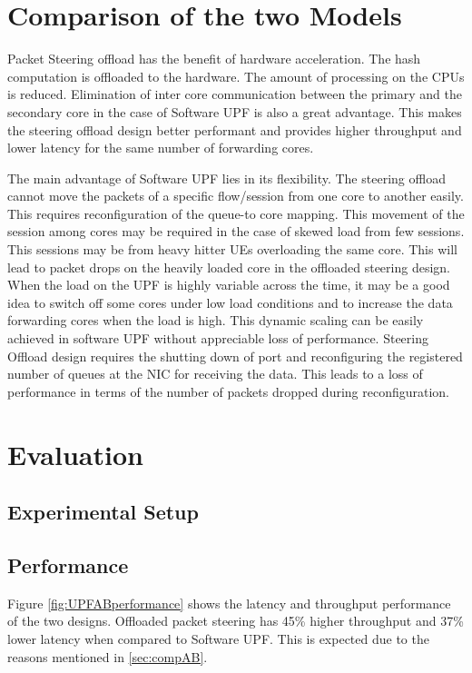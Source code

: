 \section{Comparison of the two Models \label{sec:compAB}}
Packet Steering offload has the benefit of hardware acceleration. The hash computation is offloaded to the hardware. The amount of processing on the CPUs is reduced. Elimination of inter core communication between the primary and the secondary core in the case of Software UPF is also a great advantage. This makes the steering offload design better performant and provides higher throughput and lower latency for the same number of forwarding cores.

The main advantage of Software UPF lies in its flexibility. The steering offload cannot move the packets of a specific flow/session from one core to another easily. This requires reconfiguration of the queue-to core mapping.
This movement of the session among cores may be required in the case of skewed load from few sessions. This sessions may be from heavy hitter UEs overloading the same core. This will lead to packet drops on the heavily loaded core in the offloaded steering design.
When the load on the UPF is highly variable across the time, it may be a good idea to switch off some cores under low load conditions and to increase the data
forwarding cores when the load is high. This dynamic scaling can be easily
achieved in software UPF without appreciable loss of performance. Steering Offload design requires the shutting down of port and reconfiguring the registered number of queues at the NIC for receiving the data. This leads to a loss of performance in terms of the number of packets dropped during reconfiguration.

\section{Evaluation}
\subsection{Experimental Setup}
\subsection{Performance}
Figure \ref{fig:UPFABperformance} shows the latency and throughput performance of the two designs.
Offloaded packet steering has 45\% higher throughput and 37\% lower latency when compared to Software UPF. This is expected due to the reasons mentioned in \ref{sec:compAB}.
